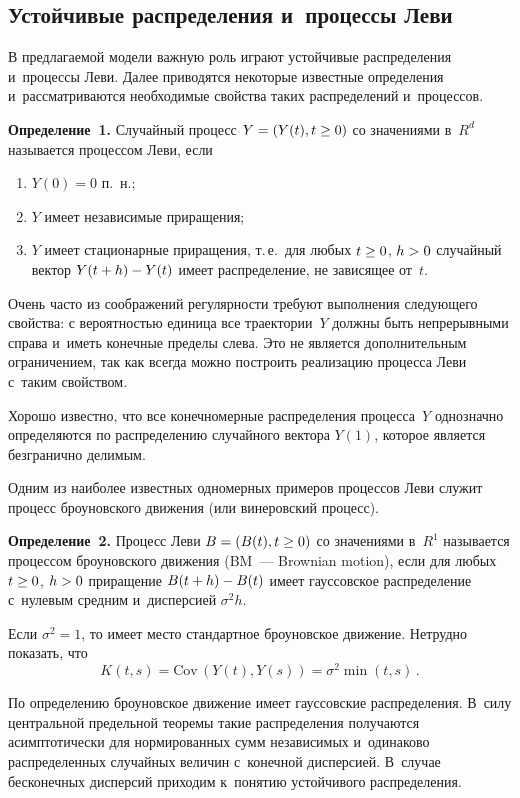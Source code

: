 \begin{multicols}{2}
\section{Устойчивые распределения и~процессы Леви}

В предлагаемой модели важную роль играют устойчивые распределения 
и~процессы Леви. Далее приводятся некоторые известные
определения и~рассматриваются необходимые свойства таких распределений и~процессов.

\smallskip

\noindent
\textbf{Определение~1.} 
Случайный процесс $Y \hm= (Y(t), t\hm\geq 0)$ со значениями в~$R^d$ 
называется процессом Леви, если
\begin{enumerate}[(1)]
\item $Y(0) = 0$ п.~н.;
\item $Y$ имеет независимые приращения;
\item $Y$ имеет стационарные приращения, т.\,е.\ для любых $t\hm\geq 0$, $h\hm>0$ 
случайный вектор
$Y(t+h) \hm- Y(t)$ имеет распределение, не зависящее от~$t$.
\end{enumerate}

Очень часто из соображений регулярности требуют выполнения следующего свойства:
с вероятностью единица все траектории~$Y$ должны быть непрерывными справа и~иметь конечные пределы слева.
Это не является дополнительным ограничением, так как всегда можно построить реализацию процесса Леви с~таким
свойством.

Хорошо известно, что все конечномерные распределения процесса~$Y$ 
однозначно определяются по распределению
случайного вектора $Y(1)$, которое является безгранично делимым.

Одним из наиболее известных одномерных примеров процессов Леви служит процесс 
броуновского движения (или винеровский процесс).


\smallskip

\noindent
\textbf{Определение~2.} 
Процесс Леви $B \hm= (B(t), t\geq 0)$ со значениями в~$R^1$ 
называется процессом броуновского движения (BM~--- Brownian motion), если
для любых $t\hm\geq 0$, $h\hm>0$ приращение $B(t+h)\hm -B(t)$ 
имеет гауссовское распределение с~нулевым средним и~дисперсией $\sigma^2 h$.


\smallskip

Если $\sigma^2 =1$,  то имеет место стандартное броуновское движение. 
Нетрудно показать, что
$$
K(t,s) = \mathrm{Cov}\, (Y(t), Y(s)) = \sigma^2 \min (t,s)  \,.
$$


По определению броуновское движение имеет гауссовские распределения. 
В~силу центральной предельной теоремы
такие распределения получаются асимптотически для нормированных сумм 
независимых и~одинаково распределенных случайных величин с~конечной дисперсией.
В~случае бесконечных дисперсий приходим к~понятию устойчивого распределения.



\end{multicols}
